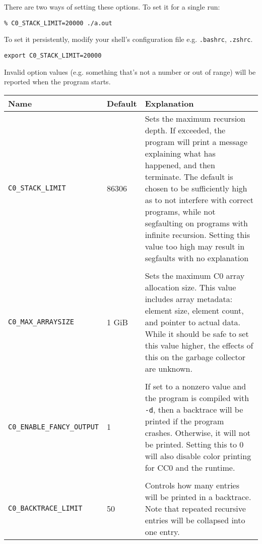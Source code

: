 \documentclass[11pt]{article}
\begin{document}
There are two ways of setting these options. To set it for a single run:
\begin{lstlisting}
% C0_STACK_LIMIT=20000 ./a.out
\end{lstlisting}
To set it persistently, modify your shell's configuration file e.g. \texttt{.bashrc}, \texttt{.zshrc}.
\begin{lstlisting}
export C0_STACK_LIMIT=20000
\end{lstlisting}
Invalid option values (e.g. something that's not a number or out of range) will be reported when the program starts.

\begin{center}
\begin{longtable}{llp{7cm}}
  Name & Default & Explanation \\
  \hline
  \rule{0pt}{\normalbaselineskip}
  \texttt{C0\_STACK\_LIMIT} & 86306 & Sets the maximum recursion depth. If exceeded, the program will print a message explaining what has happened, and then terminate. The default is chosen to be sufficiently high as to not interfere with correct programs, while not segfaulting on programs with infinite recursion. Setting this value too high may result in segfaults with no explanation \\
  \\
  \texttt{C0\_MAX\_ARRAYSIZE} & 1 GiB & Sets the maximum C0 array allocation size. This value includes array metadata: element size, element count, and pointer to actual data. While it should be safe to set this value higher, the effects of this on the garbage collector are unknown. \\
  \\
  \texttt{C0\_ENABLE\_FANCY\_OUTPUT} & 1 & If set to a nonzero value and the program is compiled with \texttt{-d}, then a backtrace will be printed if the program crashes. Otherwise, it will not be printed. Setting this to 0 will also disable color printing for CC0 and the runtime. \\
  \\
  \texttt{C0\_BACKTRACE\_LIMIT} & 50 & Controls how many entries will be printed in a backtrace. Note that repeated recursive entries will be collapsed into one entry.
\end{longtable}
\end{center}
\end{document}
